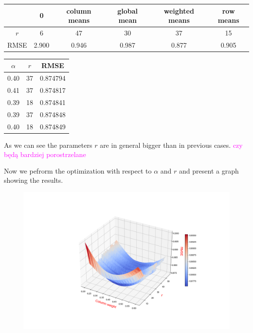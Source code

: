 \documentclass[11pt]{amsart}
\newcommand{\tami}[1]{{\textcolor{magenta}{#1}}}
\begin{document}
\begin{table}[H]
\begin{tabular}{c|ccccc}
& 0 & column means & global mean & weighted means & row means \\
\hline
$r$ & 6 & 47 & 30 & 37 & 15\\
RMSE & 2.900 & 0.946 & 0.987 & 0.877 & 0.905 \\
\end{tabular}
\end{table}

\begin{table}[H]
\begin{tabular}{cc|c}
\toprule
$\alpha$ &  $r$ &     RMSE \\
\midrule
\hline
       0.40 & 37 & 0.874794 \\
       0.41 & 37 & 0.874817 \\
       0.39 & 18 & 0.874841 \\
       0.39 & 37 & 0.874848 \\
       0.40 & 18 & 0.874849 \\
\bottomrule
\end{tabular}
\end{table}

As we can see the parameters $r$ are in general bigger than in previous cases.
\tami{czy będą bardziej porostrzelane}

Now we pefrorm the optimization with respect to $\alpha$ and $r$ and present a graph showing the results.

\begin{figure}[H]
\includegraphics[scale = 0.45]{nmf_r_w}
\end{figure}
\end{document}
